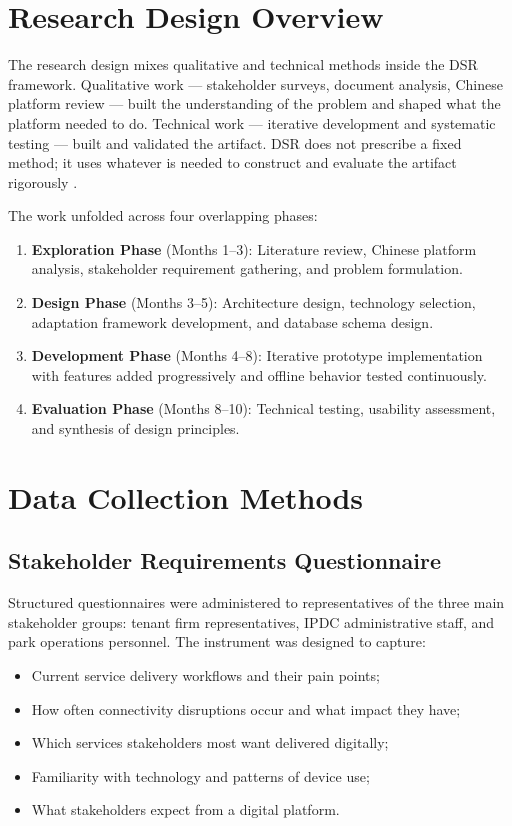 \section{Research Design Overview}

The research design mixes qualitative and technical methods inside the DSR framework. Qualitative work --- stakeholder surveys, document analysis, Chinese platform review --- built the understanding of the problem and shaped what the platform needed to do. Technical work --- iterative development and systematic testing --- built and validated the artifact. DSR does not prescribe a fixed method; it uses whatever is needed to construct and evaluate the artifact rigorously \citep{Hevner2004}.

The work unfolded across four overlapping phases:

\begin{enumerate}
\item \textbf{Exploration Phase} (Months 1--3): Literature review, Chinese platform analysis, stakeholder requirement gathering, and problem formulation.
\item \textbf{Design Phase} (Months 3--5): Architecture design, technology selection, adaptation framework development, and database schema design.
\item \textbf{Development Phase} (Months 4--8): Iterative prototype implementation with features added progressively and offline behavior tested continuously.
\item \textbf{Evaluation Phase} (Months 8--10): Technical testing, usability assessment, and synthesis of design principles.
\end{enumerate}

\section{Data Collection Methods}
\label{sec:data-collection}

\subsection{Stakeholder Requirements Questionnaire}

Structured questionnaires were administered to representatives of the three main stakeholder groups: tenant firm representatives, IPDC administrative staff, and park operations personnel. The instrument was designed to capture:

\begin{itemize}
\item Current service delivery workflows and their pain points;
\item How often connectivity disruptions occur and what impact they have;
\item Which services stakeholders most want delivered digitally;
\item Familiarity with technology and patterns of device use;
\item What stakeholders expect from a digital platform.
\end{itemize}

